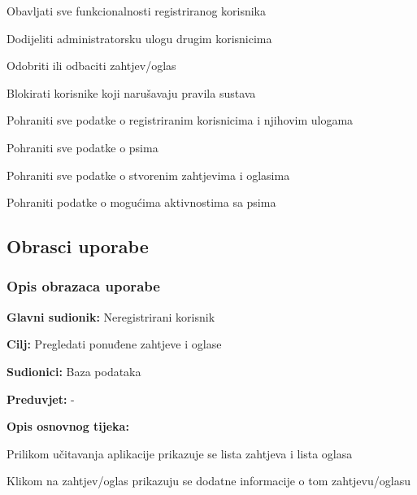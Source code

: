 \begin{packed_enum}
				\item {}
				\begin{packed_enum}
					\item Obavljati sve funkcionalnosti registriranog korisnika
					\item Dodijeliti administratorsku ulogu drugim korisnicima
					\item Odobriti ili odbaciti zahtjev/oglas
					\item Blokirati korisnike koji narušavaju pravila sustava
				\end{packed_enum}
			
				\item {}
				\begin{packed_enum}
					\item Pohraniti sve podatke o registriranim korisnicima i njihovim ulogama
					\item Pohraniti sve podatke o psima
					\item Pohraniti sve podatke o stvorenim zahtjevima i oglasima
					\item Pohraniti podatke o mogućima aktivnostima sa psima
				\end{packed_enum}
			
			\end{packed_enum}
			
			\eject 
			
			
				
			\subsection{Obrasci uporabe}
				
				\subsubsection{Opis obrazaca uporabe}					

					\noindent {}
					\begin{packed_item}
	
						\item \textbf{Glavni sudionik: } Neregistrirani korisnik 
						\item  \textbf{Cilj:} Pregledati ponuđene zahtjeve i oglase
						\item  \textbf{Sudionici:} Baza podataka 
						\item  \textbf{Preduvjet:} -
						\item  \textbf{Opis osnovnog tijeka:}
						
						\item[] \begin{packed_enum}
	
							\item Prilikom učitavanja aplikacije prikazuje se lista zahtjeva i lista oglasa
							\item Klikom na zahtjev/oglas prikazuju se dodatne informacije o tom zahtjevu/oglasu
				
						\end{packed_enum}
					\end{packed_item}
					
